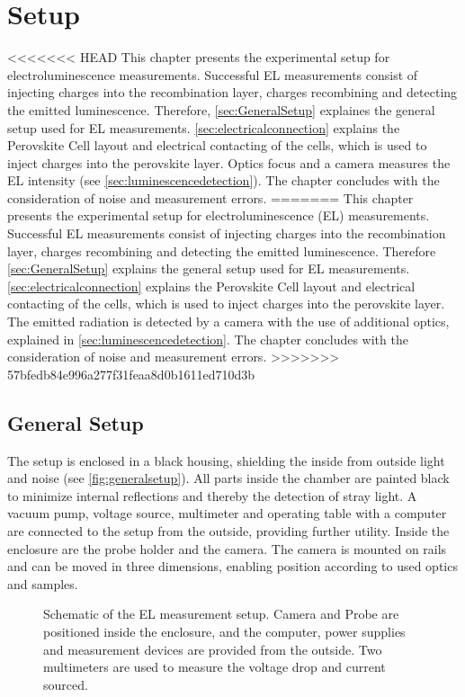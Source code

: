 \chapter{Setup}
<<<<<<< HEAD
This chapter presents the experimental setup for electroluminescence measurements. Successful EL measurements consist of injecting charges into the recombination layer, charges recombining and detecting the emitted luminescence. Therefore, \autoref{sec:GeneralSetup} explaines the general setup used for EL measurements. \autoref{sec:electricalconnection} explains the Perovskite Cell layout and electrical contacting of the cells, which is used to inject charges into the perovskite layer. Optics focus and a camera measures the EL intensity (see \autoref{sec:luminescencedetection}). The chapter concludes with the consideration of noise and measurement errors.
=======
This chapter presents the experimental setup for electroluminescence (EL) measurements. Successful EL measurements consist of injecting charges into the recombination layer, charges recombining and detecting the emitted luminescence. Therefore \autoref{sec:GeneralSetup} explains the general setup used for EL measurements. \autoref{sec:electricalconnection} explains the Perovskite Cell layout and electrical contacting of the cells, which is used to inject charges into the perovskite layer. The emitted radiation is detected by a camera with the use of additional optics,  explained in \autoref{sec:luminescencedetection}. The chapter concludes with the consideration of noise and measurement errors.
>>>>>>> 57bfedb84e996a277f31feaa8d0b1611ed710d3b

\section{General Setup}\label{sec:GeneralSetup}
The setup is enclosed in a black housing, shielding the inside from outside light and noise (see \autoref{fig:generalsetup}). All parts inside the chamber are painted black to minimize internal reflections and thereby the detection of stray light. A vacuum pump, voltage source, multimeter and operating table with a computer are connected to the setup from the outside, providing further utility. Inside the enclosure are the probe holder and the camera. The camera is mounted on rails and can be moved in three dimensions, enabling position according to used optics and samples.
\begin{figure}[h]
	\centering
	
	\caption{Schematic of the EL measurement setup. Camera and Probe are positioned inside the enclosure, and the computer, power supplies and measurement devices are provided from the outside. Two multimeters are used to measure the voltage drop and current sourced.}
	\label{fig:generalsetup}
\end{figure}
